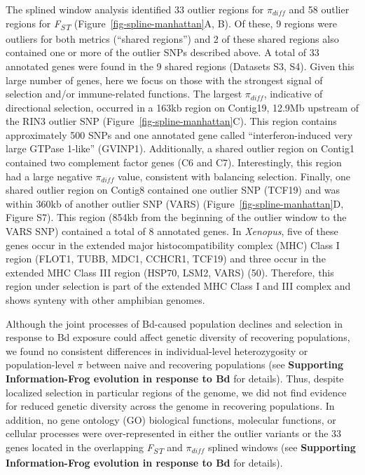 \documentclass[9pt,twocolumn,twoside,lineno]{pnas-new}
\begin{document}
The splined window analysis identified 33 outlier regions for
\(\pi_{diff}\) and 58 outlier regions for \emph{F\textsubscript{ST}}
(Figure~\ref{fig-spline-manhattan}A, B). Of these, 9 regions were
outliers for both metrics (``shared regions'') and 2 of these shared
regions also contained one or more of the outlier SNPs described above.
A total of 33 annotated genes were found in the 9 shared regions
(Datasets S3, S4). Given this large number of genes, here we focus on
those with the strongest signal of selection and/or immune-related
functions. The largest \(\pi_{diff}\), indicative of directional
selection, occurred in a 163kb region on Contig19, 12.9Mb upstream of
the RIN3 outlier SNP (Figure~\ref{fig-spline-manhattan}C). This region
contains approximately 500 SNPs and one annotated gene called
``interferon-induced very large GTPase 1-like'' (GVINP1). Additionally,
a shared outlier region on Contig1 contained two complement factor genes
(C6 and C7). Interestingly, this region had a large negative
\(\pi_{diff}\) value, consistent with balancing selection. Finally, one
shared outlier region on Contig8 contained one outlier SNP (TCF19) and
was within 360kb of another outlier SNP (VARS)
(Figure~\ref{fig-spline-manhattan}D, Figure S7).
This region (854kb from the beginning of the outlier window to the VARS
SNP) contained a total of 8 annotated genes. In \emph{Xenopus}, five of
these genes occur in the extended major histocompatibility complex (MHC)
Class I region (FLOT1, TUBB, MDC1, CCHCR1, TCF19) and three occur in the
extended MHC Class III region (HSP70, LSM2, VARS) (50). Therefore, this
region under selection is part of the extended MHC Class I and III
complex and shows synteny with other amphibian genomes.

Although the joint processes of Bd-caused population declines and
selection in response to Bd exposure could affect genetic diversity of
recovering populations, we found no consistent differences in
individual-level heterozygosity or population-level \(\pi\) between
naive and recovering populations (see \textbf{Supporting
Information-Frog evolution in response to Bd} for details). Thus,
despite localized selection in particular regions of the genome, we did
not find evidence for reduced genetic diversity across the genome in
recovering populations. In addition, no gene ontology (GO) biological
functions, molecular functions, or cellular processes were
over-represented in either the outlier variants or the 33 genes located
in the overlapping \emph{F\textsubscript{ST}} and \(\pi_{diff}\) splined
windows (see \textbf{Supporting Information-Frog evolution in response
to Bd} for details).
\end{document}
